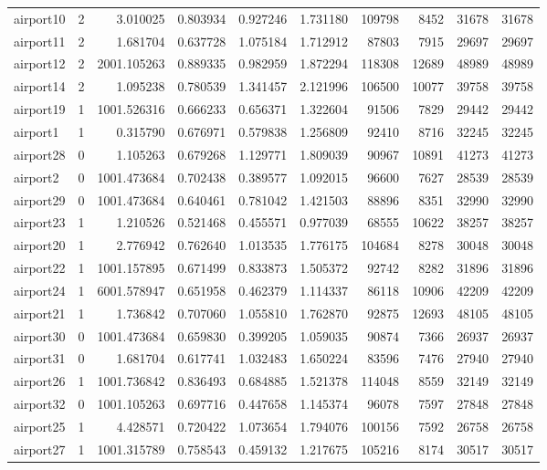 \begin{longtable}{|l|r|r|r|r|r|r|r|r|r|}
airport10 & 2 & 3.010025 & 0.803934 & 0.927246 & 1.731180 & 109798 & 8452 & 31678 & 31678 \\
airport11 & 2 & 1.681704 & 0.637728 & 1.075184 & 1.712912 & 87803 & 7915 & 29697 & 29697 \\
airport12 & 2 & 2001.105263 & 0.889335 & 0.982959 & 1.872294 & 118308 & 12689 & 48989 & 48989 \\
airport14 & 2 & 1.095238 & 0.780539 & 1.341457 & 2.121996 & 106500 & 10077 & 39758 & 39758 \\
airport19 & 1 & 1001.526316 & 0.666233 & 0.656371 & 1.322604 & 91506 & 7829 & 29442 & 29442 \\
airport1 & 1 & 0.315790 & 0.676971 & 0.579838 & 1.256809 & 92410 & 8716 & 32245 & 32245 \\
airport28 & 0 & 1.105263 & 0.679268 & 1.129771 & 1.809039 & 90967 & 10891 & 41273 & 41273 \\
airport2 & 0 & 1001.473684 & 0.702438 & 0.389577 & 1.092015 & 96600 & 7627 & 28539 & 28539 \\
airport29 & 0 & 1001.473684 & 0.640461 & 0.781042 & 1.421503 & 88896 & 8351 & 32990 & 32990 \\
airport23 & 1 & 1.210526 & 0.521468 & 0.455571 & 0.977039 & 68555 & 10622 & 38257 & 38257 \\
airport20 & 1 & 2.776942 & 0.762640 & 1.013535 & 1.776175 & 104684 & 8278 & 30048 & 30048 \\
airport22 & 1 & 1001.157895 & 0.671499 & 0.833873 & 1.505372 & 92742 & 8282 & 31896 & 31896 \\
airport24 & 1 & 6001.578947 & 0.651958 & 0.462379 & 1.114337 & 86118 & 10906 & 42209 & 42209 \\
airport21 & 1 & 1.736842 & 0.707060 & 1.055810 & 1.762870 & 92875 & 12693 & 48105 & 48105 \\
airport30 & 0 & 1001.473684 & 0.659830 & 0.399205 & 1.059035 & 90874 & 7366 & 26937 & 26937 \\
airport31 & 0 & 1.681704 & 0.617741 & 1.032483 & 1.650224 & 83596 & 7476 & 27940 & 27940 \\
airport26 & 1 & 1001.736842 & 0.836493 & 0.684885 & 1.521378 & 114048 & 8559 & 32149 & 32149 \\
airport32 & 0 & 1001.105263 & 0.697716 & 0.447658 & 1.145374 & 96078 & 7597 & 27848 & 27848 \\
airport25 & 1 & 4.428571 & 0.720422 & 1.073654 & 1.794076 & 100156 & 7592 & 26758 & 26758 \\
airport27 & 1 & 1001.315789 & 0.758543 & 0.459132 & 1.217675 & 105216 & 8174 & 30517 & 30517 \\

\end{longtable}
